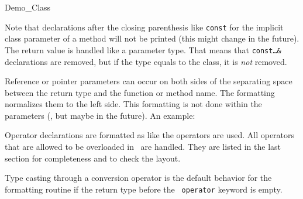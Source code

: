 \begin{class}{Demo_Class}
{Note that declarations after the closing parenthesis like {\tt const}
for the implicit class parameter of a method will not be printed
(this might change in the future).
The return value is handled like a parameter type. That means that
{\tt const\ldots\&} declarations are removed, but if the type equals
to the class, it is {\em not} removed.





Reference or pointer parameters can occur on both sides of the
separating space between the return type and the function or method
name. The formatting normalizes them to the left side. This
formatting is not done within the parameters (, but maybe in the
future). An example: 





Operator declarations are formatted as like the operators are
used.  All operators that are allowed to be overloaded in \CC\ are
handled. They are listed in the last section for completeness and
to check the layout. 

Type casting through a conversion operator is the default behavior 
for the formatting routine if the return type before the {\tt 
operator} keyword is empty.



}
\end{class}
